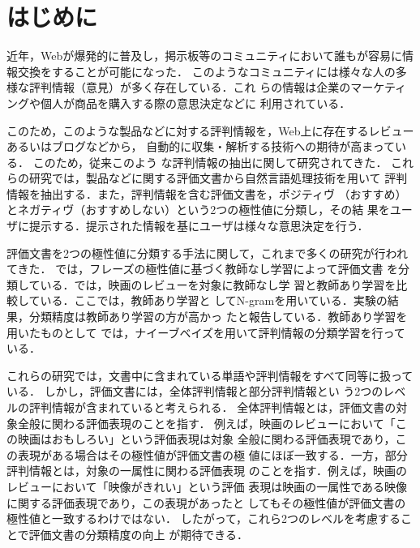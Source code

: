 \documentclass[japanese]{jnlp_1.3c}
\begin{document}
\maketitle




\section{はじめに}

近年，Webが爆発的に普及し，掲示板等のコミュニティにおいて誰もが容易に情報交換をすることが可能になった．
このようなコミュニティには様々な人の多様な評判情報（意見）が多く存在している．これ
らの情報は企業のマーケティングや個人が商品を購入する際の意思決定などに
利用されている．

このため，このような製品などに対する評判情報を，Web上に存在するレビュー
あるいはブログなどから，
自動的に収集・解析する技術への期待が高まっている．
このため，従来このよう
な評判情報の抽出に関して研究されてきた\cite{morinaga,iida,dave,kaji,yano,suzuki}．
これらの研究では，製品などに関する評価文書から自然言語処理技術を用いて
評判情報を抽出する．また，評判情報を含む評価文書を，ポジティヴ
（おすすめ）とネガティヴ（おすすめしない）という2つの極性値に分類し，その結
果をユーザに提示する．提示された情報を基にユーザは様々な意思決定を行う．

評価文書を2つの極性値に分類する手法に関して，これまで多くの研究が行われ
てきた．
\cite{turney}では，フレーズの極性値に基づく教師なし学習によって評価文書
を分類している．\cite{chaovalit}では，映画のレビューを対象に教師なし学
習\cite{turney}と教師あり学習を比較している．ここでは，教師あり学習と
してN-gramを用いている．実験の結果，分類精度は教師あり学習の方が高かっ
たと報告している．教師あり学習を用いたものとして
\cite{dave}では，ナイーブベイズを用いて評判情報の分類学習を行っている．

これらの研究では，文書中に含まれている単語や評判情報をすべて同等に扱っている．
しかし，評価文書には，全体評判情報と部分評判情報とい
う2つのレベルの評判情報が含まれていると考えられる．
全体評判情報とは，評価文書の対象全般に関わる評価表現のことを指す．
例えば，映画のレビューにおいて「この映画はおもしろい」という評価表現は対象
全般に関わる評価表現であり，この表現がある場合はその極性値が評価文書の極
値にほぼ一致する．一方，部分評判情報とは，対象の一属性に関わる評価表現
のことを指す．例えば，映画のレビューにおいて「映像がきれい」という評価
表現は映画の一属性である映像に関する評価表現であり，この表現があったと
してもその極性値が評価文書の極性値と一致するわけではない．
したがって，これら2つのレベルを考慮することで評価文書の分類精度の向上
が期待できる．
\end{document}
